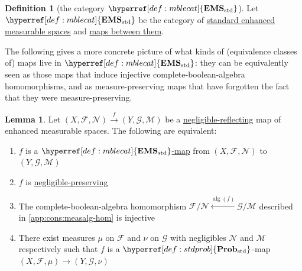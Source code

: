 \documentclass[
  sigconf,
  screen, ]{acmart}
\theoremstyle{definition}
\newtheorem{lemma}[theorem]{Lemma}
\newtheorem{definition}[theorem]{Definition}
\newcommand\calF{\mathcal F}
\newcommand\calG{\mathcal G}
\newcommand\calM{\mathcal M}
\newcommand\calN{\mathcal N}
\newcommand\nref[2]{\hyperref[#1]{#2}} \newcommand\checkhigh{{\huge{\color{red}\textbf{TODO: check}}}}
\newcommand\measalg{\operatorname{\nref{app:cons:measalg}{alg}}}
\newcommand\texStdProb{\mathbf{Prob}_{\rm std}}
\newcommand\StdProb{{\nref{def:stdprob}{\texStdProb}}}
\newcommand\texStdMble{\mathbf{EMS}_{\rm std}}
\newcommand\StdMble{{\nref{def:mblecat}{\texStdMble}}}
\begin{document}
\begin{definition}[the category $\StdMble$] \label{app:def:mblecat}
  Let $\StdMble$ be the category of
  \nref{app:def:stems}{standard enhanced measurable spaces}
  and \nref{app:def:stems-mor}{maps between them}.
\end{definition}

The following gives
  a more concrete picture of
  what kinds of (equivalence classes of) maps live in $\StdMble$:
  they can be equivalently seen as
  those maps that induce injective complete-boolean-algebra homomorphisms,
  and as measure-preserving maps that have forgotten the 
  fact that they were measure-preserving.

\begin{lemma} \label{app:lem:mblecat-map-char}
  Let $(X,\calF,\calN)\xrightarrow f(Y,\calG,\calM)$
  be a \nref{app:def:neg-refl}{negligible-reflecting} map of 
  enhanced measurable spaces.
  The following are equivalent:
  \begin{enumerate}
  \item $f$ is a \nref{app:def:stems-mor}{$\StdMble$-map} from $(X,\calF,\calN)$ to $(Y,\calG,\calM)$
  \item $f$ is \nref{app:def:neg-refl}{negligible-preserving}
  \item The complete-boolean-algebra homomorphism
    $\calF/\calN\xleftarrow{\measalg(f)}\calG/\calM$ 
    described in \cref{app:cons:measalg-hom}
    is injective
  \item There exist measures $\mu$ on $\calF$ and $\nu$ on $\calG$
    with negligibles $\calN$ and $\calM$ respectively
    such that $f$ is a $\StdProb$-map
    $(X,\calF,\mu)\to(Y,\calG,\nu)$
  \end{enumerate}
\end{lemma}
\end{document}
